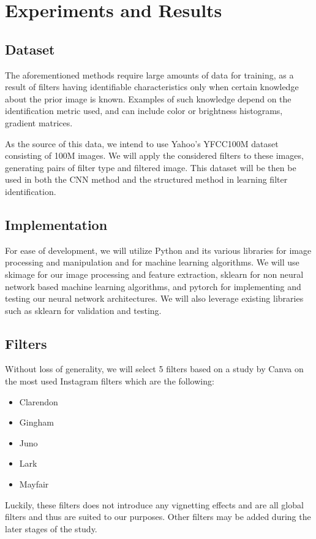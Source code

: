 \documentclass[a4paper, 11pt]{article}
\begin{document}

\section*{Experiments and Results}

\subsection*{Dataset}
The aforementioned methods require large amounts of data for training, as a result of filters having identifiable characteristics only when certain knowledge about the prior image is known. Examples of such knowledge depend on the identification metric used, and can include color or brightness histograms, gradient matrices.

As the source of this data, we intend to use Yahoo's YFCC100M dataset \cite{Yahoo} consisting of 100M images. We will apply the considered filters to these images, generating pairs of filter type and filtered image. This dataset will be then be used in both the CNN method and the structured method in learning filter identification.

\subsection*{Implementation}
For ease of development, we will utilize Python and its various libraries for image processing and manipulation and for machine learning algorithms. We will use skimage for our image processing and feature extraction, sklearn for non neural network based machine learning algorithms, and pytorch for implementing and testing our neural network architectures. We will also leverage existing libraries such as sklearn for validation and testing. 

\subsection*{Filters}
Without loss of generality, we will select 5 filters based on a study by Canva on the most used Instagram filters \cite{Canva} which are the following:
\begin{itemize}
    \item Clarendon
    \item Gingham
    \item Juno
    \item Lark
    \item Mayfair
\end{itemize}
Luckily, these filters does not introduce any vignetting effects and are all global filters and thus are suited to our purposes. Other filters may be added during the later stages of the study.
\end{document}
